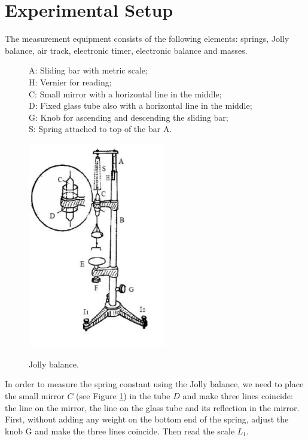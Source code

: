 \section{Experimental Setup}

The measurement equipment consists of the following elements: springs, Jolly
balance, air track, electronic timer, electronic balance and masses.

\begin{figure}[H]
\centering
\begin{minipage}{8cm}
A: Sliding bar with metric scale;\\
H: Vernier for reading;\\
C: Small mirror with a horizontal line in the middle;\\
D: Fixed glass tube also with a horizontal line in the middle;\\
G: Knob for ascending and descending the sliding bar;\\
S: Spring attached to top of the bar A.\\
\end{minipage}
\hspace{0.5cm}
\begin{minipage}{6cm}
\label{jb}
\includegraphics[width=6cm]{fig/ejb}
\end{minipage}
\caption{Jolly balance.}
\end{figure}

In order to measure the spring constant using the Jolly balance, we need to
place the small mirror $C$ (see Figure \ref{jb}) in the tube $D$ and make
three lines coincide: the line on the mirror, the line on the glass tube and its
reflection in the mirror. First, without adding any weight on the bottom end of
the spring, adjust the knob G and make the three lines coincide. Then read the
scale $L_1$. 
    
